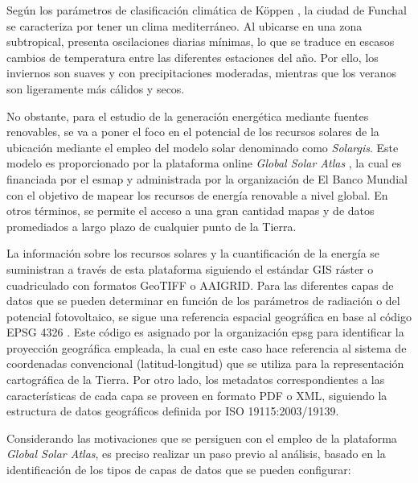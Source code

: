 \vspace{3mm}

Según los parámetros de clasificación climática de Köppen \cite{koppen}, la ciudad de Funchal se caracteriza por tener un clima mediterráneo. Al ubicarse en una zona subtropical, presenta oscilaciones diarias mínimas, lo que se traduce en escasos cambios de temperatura entre las diferentes estaciones del año. Por ello, los inviernos son suaves y con precipitaciones moderadas, mientras que los veranos son ligeramente más cálidos y secos. 

\vspace{3mm}

No obstante, para el estudio de la generación energética mediante fuentes renovables, se va a poner el foco en el potencial de los recursos solares de la ubicación mediante el empleo del modelo solar denominado como \textit{Solargis}. Este modelo es proporcionado por la plataforma online \textit{Global Solar Atlas} \cite{globalsolar}, la cual es financiada por el \gls{esmap} y administrada por la organización de El Banco Mundial con el objetivo de mapear los recursos de energía renovable a nivel global. En otros términos, se permite el acceso a una gran cantidad mapas y de datos promediados a largo plazo de cualquier punto de la Tierra. \cite{energydata}

\vspace{3mm}

La información sobre los recursos solares y la cuantificación de la energía se suministran a través de esta plataforma siguiendo el estándar GIS ráster o cuadriculado con formatos GeoTIFF o AAIGRID. Para las diferentes capas de datos que se pueden determinar en función de los parámetros de radiación o del potencial fotovoltaico, se sigue una referencia espacial geográfica en base al código EPSG 4326 \cite{epsg}. Este código es asignado por la organización \gls{epsg} para identificar la proyección geográfica empleada, la cual en este caso hace referencia al sistema de coordenadas convencional (latitud-longitud) que se utiliza para la representación cartográfica de la Tierra. Por otro lado, los metadatos correspondientes a las características de cada capa se proveen en formato PDF o XML, siguiendo la estructura de datos geográficos definida por ISO 19115:2003/19139.~\cite{globalsolar} \cite{globalsolarreport}

\vspace{3mm}

Considerando las motivaciones que se persiguen con el empleo de la plataforma \textit{Global Solar Atlas}, es preciso realizar un paso previo al análisis, basado en la identificación de los tipos de capas de datos que se pueden configurar: \cite{globalsolarreport}

